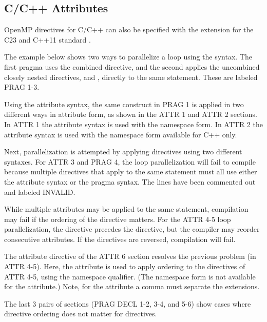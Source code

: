 \begin{ccppspecific}[4ex]
\section{C/C++ Attributes}
\label{sec:attributes}

OpenMP directives for C/C++ can also be specified with 
the  extension for the C23 and C++11 standard .

The example below shows two ways to parallelize a  loop using the  syntax.
The first pragma uses the combined  directive, and the second
applies the uncombined closely nested directives,  and , directly to the same statement. 
These are labeled PRAG 1-3.

Using the attribute syntax, the same construct in PRAG 1
is applied in two different ways in attribute form, as shown in the ATTR 1 and ATTR 2 sections.
In ATTR 1 the attribute syntax is used with the  namespace form.
In ATTR 2 the attribute syntax is used with the  namespace
form available for C++ only.

Next, parallelization is attempted by applying directives using two different syntaxes.
For ATTR 3 and PRAG 4, the loop parallelization will fail to compile because multiple directives that
apply to the same statement must all use either the attribute syntax or the pragma syntax.
The lines have been commented out and labeled INVALID.

While multiple attributes may be applied to the same statement,
compilation may fail if the ordering of the directive matters.
For the ATTR 4-5 loop parallelization, the  directive precedes 
the  directive, but the compiler may reorder consecutive attributes.
If the directives are reversed, compilation will fail.

The attribute directive of the ATTR 6 section resolves the previous problem (in ATTR 4-5).
Here, the  attribute is used to apply ordering to the
directives of ATTR 4-5, using the  namespace qualifier. (The
 namespace form is not available for the  attribute.) 
Note, for the  attribute a comma must separate the  extensions.


The last 3 pairs of sections (PRAG DECL 1-2, 3-4, and 5-6) show cases where 
directive ordering does not matter for  directives. 


\end{ccppspecific}
